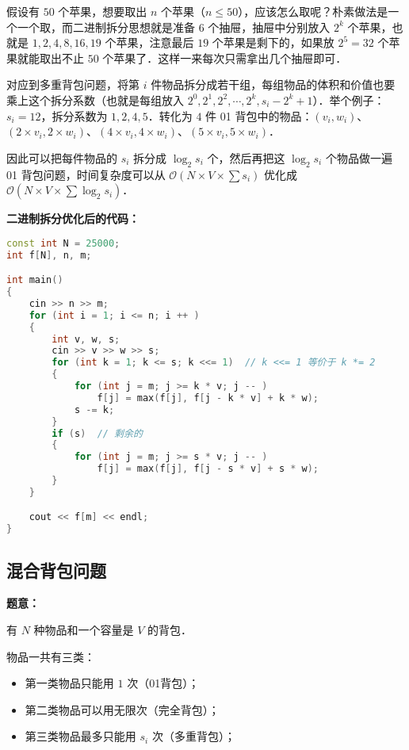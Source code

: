 假设有 $50$ 个苹果，想要取出 $n$ 个苹果（$n \leq 50$），应该怎么取呢？朴素做法是一个一个取，而二进制拆分思想就是准备 $6$ 个抽屉，抽屉中分别放入 $2^k$ 个苹果，也就是 $1, 2, 4, 8, 16, 19$ 个苹果，注意最后 $19$ 个苹果是剩下的，如果放 $2^5 = 32$ 个苹果就能取出不止 $50$ 个苹果了．这样一来每次只需拿出几个抽屉即可．

对应到多重背包问题，将第 $i$ 件物品拆分成若干组，每组物品的体积和价值也要乘上这个拆分系数（也就是每组放入 $2^0, 2^1, 2^2, \cdots , 2^k, s_i - 2^k + 1$）．举个例子：$s_i = 12$，拆分系数为 $1, 2, 4, 5$．转化为 $4$ 件 01 背包中的物品：$(v_i, w_i)$、$(2 \times v_i, 2 \times w_i)$、$(4 \times v_i, 4 \times w_i)$、$(5 \times v_i, 5 \times w_i)$．

因此可以把每件物品的 $s_i$ 拆分成 $\log_2 s_i$ 个，然后再把这 $\log_2 s_i$ 个物品做一遍 01 背包问题，时间复杂度可以从 $\mathcal{O}(N \times V \times \sum s_i)$ 优化成 $\mathcal{O}(N \times V \times \sum \log_2 s_i)$．

\textbf{二进制拆分优化后的代码：}

\begin{lstlisting}[language=cpp]
const int N = 25000;
int f[N], n, m;

int main()
{
    cin >> n >> m;
    for (int i = 1; i <= n; i ++ ) 
    {
        int v, w, s;
        cin >> v >> w >> s;
        for (int k = 1; k <= s; k <<= 1)  // k <<= 1 等价于 k *= 2
        {
            for (int j = m; j >= k * v; j -- )
                f[j] = max(f[j], f[j - k * v] + k * w);
            s -= k;
        }
        if (s)  // 剩余的
        {
            for (int j = m; j >= s * v; j -- )
                f[j] = max(f[j], f[j - s * v] + s * w);
        }
    }

    cout << f[m] << endl;
}
\end{lstlisting}

\subsection{混合背包问题}

\textbf{题意：}

有 $N$ 种物品和一个容量是 $V$ 的背包．

物品一共有三类：

\begin{itemize}
\item 第一类物品只能用 $1$ 次（01背包）；
\item 第二类物品可以用无限次（完全背包）；
\item 第三类物品最多只能用 $s_i$ 次（多重背包）；
\end{itemize}

